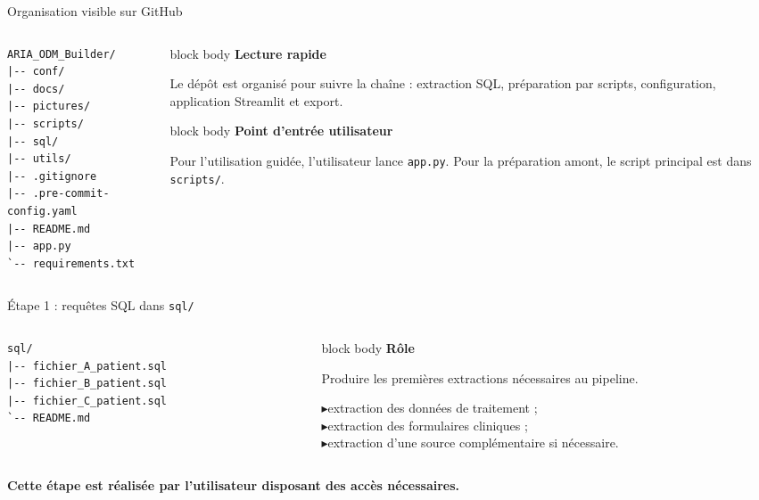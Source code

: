 \documentclass[10pt,aspectratio=169]{beamer}
\newcommand{\smallbullet}{\textcolor{MainBlue}{$\blacktriangleright$}\hspace{0.4em}}
\newenvironment{infobox}[1]
{\begin{beamercolorbox}[rounded=true,shadow=false,wd=\linewidth,sep=0.8em]{block body}
\textbf{\color{DarkBlue}#1}\par\vspace{0.3em}}
{\end{beamercolorbox}}
\begin{document}
\begin{frame}[fragile]{Organisation visible sur GitHub}
\begin{columns}[T,onlytextwidth]
\begin{column}{0.46\linewidth}
\begin{lstlisting}
ARIA_ODM_Builder/
|-- conf/
|-- docs/
|-- pictures/
|-- scripts/
|-- sql/
|-- utils/
|-- .gitignore
|-- .pre-commit-config.yaml
|-- README.md
|-- app.py
`-- requirements.txt
\end{lstlisting}
\end{column}

\begin{column}{0.50\linewidth}
\begin{infobox}{Lecture rapide}
Le dépôt est organisé pour suivre la chaîne : extraction SQL, préparation par scripts, configuration, application Streamlit et export.
\end{infobox}

\vspace{0.5cm}

\begin{infobox}{Point d'entrée utilisateur}
Pour l'utilisation guidée, l'utilisateur lance \texttt{app.py}. Pour la préparation amont, le script principal est dans \texttt{scripts/}.
\end{infobox}
\end{column}
\end{columns}
\end{frame}

\begin{frame}[fragile]{Étape 1 : requêtes SQL dans \texttt{sql/}}
\begin{columns}[T,onlytextwidth]
\begin{column}{0.46\linewidth}
\begin{lstlisting}
sql/
|-- fichier_A_patient.sql
|-- fichier_B_patient.sql
|-- fichier_C_patient.sql
`-- README.md
\end{lstlisting}
\end{column}

\begin{column}{0.50\linewidth}
\begin{infobox}{Rôle}
Produire les premières extractions nécessaires au pipeline.

\vspace{0.4em}
\smallbullet extraction des données de traitement ;\\
\smallbullet extraction des formulaires cliniques ;\\
\smallbullet extraction d'une source complémentaire si nécessaire.
\end{infobox}
\end{column}
\end{columns}

\vfill
\centering
\textbf{Cette étape est réalisée par l'utilisateur disposant des accès nécessaires.}
\end{frame}
\end{document}
